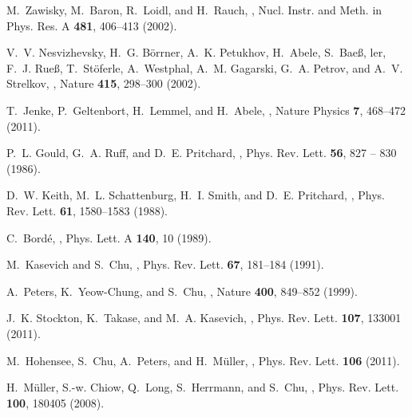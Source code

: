 \documentclass[11pt]{article}
\begin{document}
\begin{thebibliography}{100}
M.~Zawisky, M.~Baron, R.~Loidl, and H.~Rauch,
,
\newblock Nucl. Instr. and Meth. in Phys. Res. A {\bf 481}, 406–413 (2002).

V.~V. Nesvizhevsky, H.~G. Börrner, A.~K. Petukhov, H.~Abele, S.~Bae\ss, ler,
  F.~J. Rue\ss, T.~Stöferle, A.~Westphal, A.~M. Gagarski, G.~A. Petrov, and
  A.~V. Strelkov,
,
\newblock Nature {\bf 415}, 298--300 (2002).

T.~Jenke, P.~Geltenbort, H.~Lemmel, and H.~Abele,
,
\newblock Nature Physics {\bf 7}, 468–472 (2011).

P.~L. Gould, G.~A. Ruff, and D.~E. Pritchard,
,
\newblock Phys. Rev. Lett. {\bf 56}, 827 -- 830 (1986).

D.~W. Keith, M.~L. Schattenburg, H.~I. Smith, and D.~E. Pritchard,
,
\newblock Phys. Rev. Lett. {\bf 61}, 1580--1583 (1988).

C.~Bordé,
,
\newblock Phys. Lett. A {\bf 140}, 10 (1989).

M.~Kasevich and S.~Chu,
,
\newblock Phys. Rev. Lett. {\bf 67}, 181--184 (1991).

A.~Peters, K.~Yeow-Chung, and S.~Chu,
,
\newblock Nature {\bf 400}, 849--852 (1999).

J.~K. Stockton, K.~Takase, and M.~A. Kasevich,
,
\newblock Phys. Rev. Lett. {\bf 107}, 133001 (2011).

M.~Hohensee, S.~Chu, A.~Peters, and H.~Müller,
,
\newblock Phys. Rev. Lett. {\bf 106} (2011).

H.~Müller, S.-w. Chiow, Q.~Long, S.~Herrmann, and S.~Chu,
,
\newblock Phys. Rev. Lett. {\bf 100}, 180405 (2008).


\end{thebibliography}
\end{document}
